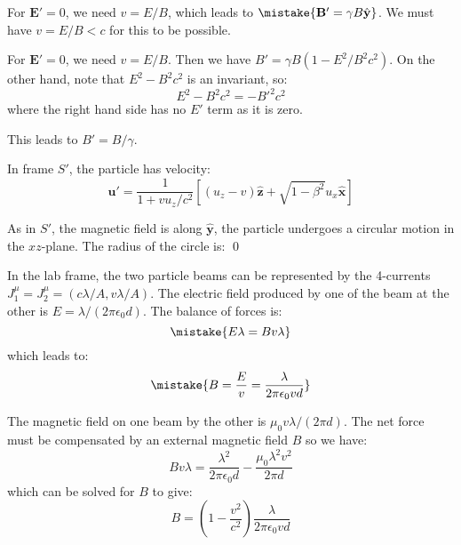 \documentclass[12pt]{article}
\begin{document}
For $\mathbf{E}' = 0$, we need $v = E/B$, which leads to $\mistake{\mathbf{B}' = \gamma B \hat{\mathbf{y}}}$. We must have $v = E/B < c$ for this to be possible.

\begin{correction}
    For $\mathbf{E}' = 0$, we need $v = E/B$. Then we have $B' = \gamma B (1 - E^{2}/B^{2}c^{2})$. On the other hand, note that $E^{2} - B^{2}c^{2}$ is an invariant, so:
    \begin{equation}
        E^{2} - B^{2}c^{2} = -B'^{2}c^{2}
    \end{equation}
    where the right hand side has no $E'$ term as it is zero.

    This leads to $B' = B/\gamma$.
\end{correction}

In frame $S'$, the particle has velocity:
\begin{equation}
    \mathbf{u}' = \frac{1}{1 + vu_{z}/c^{2}} \left[ (u_{z} - v) \hat{\mathbf{z}} + \sqrt{1 - \beta^{2}} u_{x} \hat{\mathbf{x}} \right]
\end{equation}

As in $S'$, the magnetic field is along $\hat{\mathbf{y}}$, the particle undergoes a circular motion in the $xz$-plane. The radius of the circle is:
\qed



In the lab frame, the two particle beams can be represented by the 4-currents $J_{1}^{\mu} = J_{2}^{\mu} = (c\lambda/A, v\lambda/A)$. The electric field produced by one of the beam at the other is $E = \lambda/(2\pi\epsilon_{0}d)$. The balance of forces is:
\begin{equation}
    \mistake{E\lambda = Bv\lambda}
\end{equation}
which leads to:
\begin{equation}
    \mistake{B = \frac{E}{v} = \frac{\lambda}{2\pi\epsilon_{0}vd}}
\end{equation}

\begin{correction}
    The magnetic field on one beam by the other is $\mu_{0}v\lambda/(2\pi d)$. The net force must be compensated by an external magnetic field $B$ so we have:
    \begin{equation}
        Bv\lambda = \frac{\lambda^{2}}{2\pi\epsilon_{0}d} - \frac{\mu_{0}\lambda^{2} v^{2}}{2\pi d}
    \end{equation}
    which can be solved for $B$ to give:
    \begin{equation}
        B = \left( 1 - \frac{v^{2}}{c^{2}} \right) \frac{\lambda}{2\pi\epsilon_{0}vd}
    \end{equation}
\end{correction}
\end{document}
